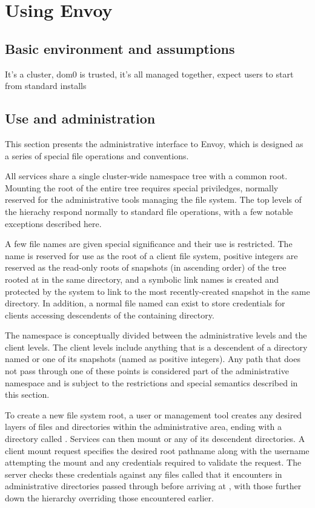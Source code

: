\section{Using Envoy}

\subsection{Basic environment and assumptions}


It's a cluster, dom0 is trusted, it's all managed together, expect users to start from standard installs

\subsection{Use and administration}

This section presents the administrative interface to Envoy, which is designed as a series of special file operations and conventions.

All services share a single cluster-wide namespace tree with a common root. Mounting the root of the entire tree requires special priviledges, normally reserved for the administrative tools managing the file system. The top levels of the hierachy respond normally to standard file operations, with a few notable exceptions described here.

A few file names are given special significance and their use is restricted. The name \current is reserved for use as the root of a client file system, positive integers are reserved as the read-only roots of snapshots (in ascending order) of the tree rooted at \current in the same directory, and a symbolic link names \snapshot is created and protected by the system to link to the most recently-created snapshot in the same directory. In addition, a normal file named \password can exist to store credentials for clients accessing descendents of the containing directory.

The namespace is conceptually divided between the administrative levels and the client levels. The client levels include anything that is a descendent of a directory named \current or one of its snapshots (named as positive integers). Any path that does not pass through one of these points is considered part of the administrative namespace and is subject to the restrictions and special semantics described in this section.

To create a new file system root, a user or management tool creates any desired layers of files and directories within the administrative area, ending with a directory called \current. Services can then mount \current or any of its descendent directories. A client mount request specifies the desired root pathname along with the username attempting the mount and any credentials required to validate the request. The server checks these credentials against any files called \password that it encounters in administrative directories passed through before arriving at \current, with those further down the hierarchy overriding those encountered earlier.

